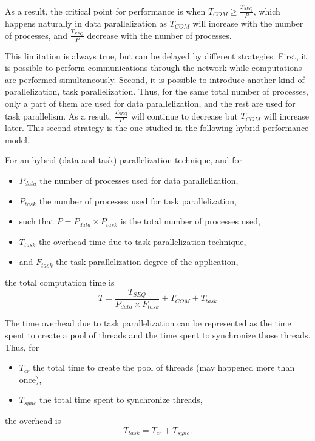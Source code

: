 As a result, the critical point for performance is when $T_{COM} \geq \frac{T_{SEQ}}{P}$, which happens naturally in data parallelization as $T_{COM}$ will increase with the number of processes, and $\frac{T_{SEQ}}{P}$ decrease with the number of processes.

This limitation is always true, but can be delayed by different strategies. First, it is possible to perform communications through the network while computations are performed simultaneously. Second, it is possible to introduce another kind of parallelization, task parallelization. Thus, for the same total number of processes, only a part of them are used for data parallelization, and the rest are used for task parallelism. As a result, $\frac{T_{SEQ}}{P}$ will continue to decrease but $T_{COM}$ will increase later. This second strategy is the one studied in the following hybrid performance model.

For an hybrid (data and task) parallelization technique, and for
\begin{itemize}
\item $P_{data}$ the number of processes used for data parallelization,
\item $P_{task}$ the number of processes used for task parallelization,
\item such that $P = P_{data} \times P_{task}$ is the total number of processes used,
\item $T_{task}$ the overhead time due to task parallelization technique,
\item and $F_{task}$ the task parallelization degree of the application,
\end{itemize}
the total computation time is
\begin{equation}
T = \frac{T_{SEQ}}{P_{data} \times F_{task}} + T_{COM} + T_{task}
\end{equation}

The time overhead due to task parallelization can be represented as the time spent to create a pool of threads and the time spent to synchronize those threads. Thus, for
\begin{itemize}
\item $T_{cr}$ the total time to create the pool of threads (may happened more than once), 
\item $T_{sync}$ the total time spent to synchronize threads, 
\end{itemize}
the overhead is
\begin{equation*}
T_{task} = T_{cr} + T_{sync}.
\end{equation*}

